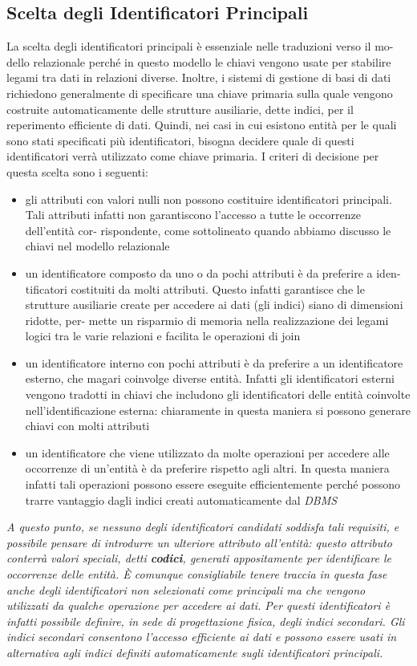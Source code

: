 \documentclass[a4paper,12pt, oneside]{book}
\begin{document}
\subsection{Scelta degli Identificatori Principali}
La scelta degli identificatori principali è essenziale nelle traduzioni verso il mo-
dello relazionale perché in questo modello le chiavi
vengono usate per stabilire legami tra dati in relazioni diverse. Inoltre, i sistemi di
gestione di basi di dati richiedono generalmente di specificare una chiave
primaria sulla quale vengono costruite automaticamente delle strutture ausiliarie, dette
indici, per il reperimento efficiente di dati. Quindi, nei casi in cui esistono entità
per le quali sono stati specificati più identificatori, bisogna decidere quale di questi
identificatori verrà utilizzato come chiave primaria.
I criteri di decisione per questa scelta sono i seguenti:
\begin{itemize}
\item gli attributi con valori nulli non possono costituire identificatori principali. Tali
attributi infatti non garantiscono l'accesso a tutte le occorrenze dell'entità cor-
rispondente, come sottolineato quando abbiamo discusso le chiavi nel modello
relazionale
\item un identificatore composto da uno o da pochi attributi è da preferire a iden-
tificatori costituiti da molti attributi. Questo infatti garantisce che le strutture
ausiliarie create per accedere ai dati (gli indici) siano di dimensioni ridotte, per-
mette un risparmio di memoria nella realizzazione dei legami logici tra le varie
relazioni e facilita le operazioni di join
\item un identificatore interno con pochi
attributi è da preferire a un identificatore esterno, che magari coinvolge diverse
entità. Infatti gli identificatori esterni vengono tradotti in chiavi che includono gli identificatori delle entità coinvolte
nell'identificazione esterna: chiaramente in questa maniera si possono generare
chiavi con molti attributi
\item un identificatore che viene utilizzato da molte operazioni per accedere alle occorrenze di un'entità è da preferire rispetto agli altri. In questa maniera infatti
tali operazioni possono essere eseguite efficientemente perché possono trarre
vantaggio dagli indici creati automaticamente dal \textit{DBMS}
\end{itemize}
\textit{A questo punto, se nessuno degli identificatori candidati soddisfa tali requisiti,
e possibile pensare di introdurre un ulteriore attributo all'entità: questo attributo
conterrà valori speciali, detti \textbf{codici}, generati appositamente per identificare le
occorrenze delle entità. È comunque consigliabile tenere traccia in questa fase anche degli identificatori
non selezionati come principali ma che vengono utilizzati da qualche operazione
per accedere ai dati. Per questi identificatori è infatti possibile definire, in sede
di progettazione fisica, degli indici secondari. Gli indici secondari consentono
l'accesso efficiente ai dati e possono essere usati in alternativa agli indici definiti
automaticamente sugli identificatori principali.}
\end{document}
